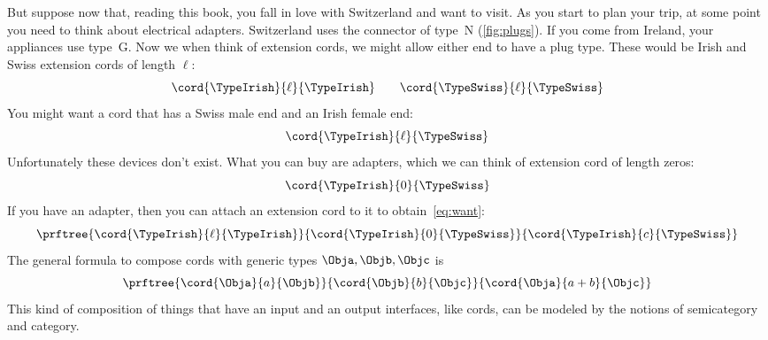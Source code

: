 But suppose now that, reading this book, you fall in love with Switzerland and want to visit.
As you start to plan your trip, at some point you need to think about electrical adapters.
Switzerland uses the connector of type~N (\cref{fig:plugs}).
If you come from Ireland, your appliances use type~G.
Now we when think of extension cords, we might allow either end to have a plug type.
%
These would be Irish and Swiss extension cords of length $\ell$:
%
\begin{equation}\label{eq:irish-swiss}
    \cord{\TypeIrish}{\ell}{\TypeIrish} \qquad \cord{\TypeSwiss}{\ell}{\TypeSwiss}
\end{equation}
%
You might want a cord that has a Swiss male end and an Irish female end:
%
\begin{equation}
    \label{eq:want}
    \cord{\TypeIrish}{\ell}{\TypeSwiss}
\end{equation}
%
Unfortunately these devices don't exist.
What you can buy are adapters, which we can think of extension cord of length zeros:
\begin{equation}
    \cord{\TypeIrish}{0}{\TypeSwiss}
\end{equation}
%
If you have an adapter, then you can attach an extension cord to it to obtain~\cref{eq:want}:
%
\begin{equation}
    \label{eq:irish-swiss-result}
    \prftree{\cord{\TypeIrish}{\ell}{\TypeIrish}}{\cord{\TypeIrish}{0}{\TypeSwiss}}{\cord{\TypeIrish}{c}{\TypeSwiss}}
\end{equation}
%
The general formula to compose cords with generic types $\Obja, \Objb, \Objc$ is
%
\begin{equation}
    \label{eq:cords-generic}
    \prftree{\cord{\Obja}{a}{\Objb}}{\cord{\Objb}{b}{\Objc}}{\cord{\Obja}{a+b}{\Objc}}
\end{equation}
%
This kind of composition of things that have an input and an output interfaces, like cords, can be modeled by the notions of semicategory and category.


%

%
%
%


